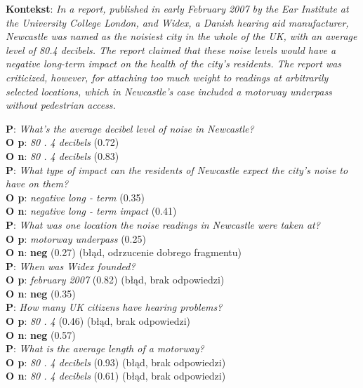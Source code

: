 \vspace{.3cm}

\noindent
\textbf{Kontekst}:
\textit{In a report, published in early February 2007 by the Ear Institute at the University College London, and Widex, a Danish hearing aid manufacturer, Newcastle was named as the noisiest city in the whole of the UK, with an average level of 80.4 decibels. The report claimed that these noise levels would have a negative long-term impact on the health of the city's residents. The report was criticized, however, for attaching too much weight to readings at arbitrarily selected locations, which in Newcastle's case included a motorway underpass without pedestrian access.}

\noindent
\textbf{P}: \textit{What's the average decibel level of noise in Newcastle?}\\
\textbf{O p}: \textit{80 . 4 decibels} (0.72)\\
\textbf{O n}: \textit{80 . 4 decibels} (0.83)\\[5pt]
\textbf{P}: \textit{What type of impact can the residents of Newcastle expect the city's noise to have on them?}\\
\textbf{O p}: \textit{negative long - term} (0.35)\\
\textbf{O n}: \textit{negative long - term impact} (0.41)\\[5pt]
\textbf{P}: \textit{What was one location the noise readings in Newcastle were taken at?}\\
\textbf{O p}: \textit{motorway underpass} (0.25)\\
\textbf{O n}: \textbf{neg} (0.27) (błąd, odrzucenie dobrego fragmentu)\\[10pt]
\textbf{P}: \textit{When was Widex founded?}\\
\textbf{O p}: \textit{february 2007} (0.82) (błąd, brak odpowiedzi)\\
\textbf{O n}: \textbf{neg} (0.35)\\[5pt]
\textbf{P}: \textit{How many UK citizens have hearing problems?}\\
\textbf{O p}: \textit{80 . 4} (0.46) (błąd, brak odpowiedzi)\\
\textbf{O n}: \textbf{neg} (0.57)\\[5pt]
\textbf{P}: \textit{What is the average length of a motorway?}\\
\textbf{O p}: \textit{80 . 4 decibels} (0.93) (błąd, brak odpowiedzi)\\
\textbf{O n}: \textit{80 . 4 decibels} (0.61) (błąd, brak odpowiedzi)

